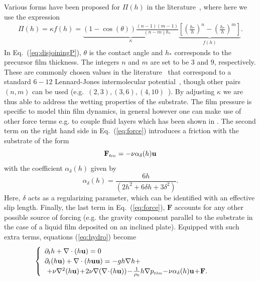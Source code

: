 Various forms have been proposed for $\Pi(h)$ in the literature~\cite{oronLongscaleEvolutionThin1997,thielePatternedDepositionMoving2014}, where here we use the expression
\begin{eqnarray}\label{eq:disjoiningP}
  \Pi(h) = \kappa f(h) = \underbrace{(1 - \cos(\theta))\frac{(n-1)(m-1)}{(n-m)h_*}}_{\kappa}\underbrace{\left[\left(\frac{h_*}{h}\right)^n -\left(\frac{h_*}{h}\right)^m\right]}_{f(h)}.
\end{eqnarray}
In Eq.~(\ref{eq:disjoiningP}), $\theta$ is the contact angle and $h_*$ corresponds to the precursor film thickness. 
The integers $n$ and $m$ are set to be $3$ and $9$, respectively. 
These are commonly chosen values in the literature~\cite{moultonEffectDisjoiningPressure2013,oronLongscaleEvolutionThin1997} that correspond to a standard $6-12$ Lennard-Jones intermolecular potential~\cite{fischerExistencePositiveSolutions2018}, though other pairs $(n,m)$ can be used (e.g.~$(2,3), (3,6), (4,10)$~\cite{diezStabilityFinitelengthRivulet2009,wilczekSlidingDropsEnsemble2017, wedershovenInfraredLaserInduced2014}). 
By adjusting $\kappa$ we are thus able to address the wetting properties of the substrate. 
The film pressure is specific to model thin film dynamics, in general however one can make use of other force terms e.g. to couple fluid layers which has been shown in \cite{roccaDevelopmentLatticeBoltzmann2012}. 
The second term on the right hand side in Eq.~(\ref{eq:force}) introduces a friction with the substrate of the form
\begin{equation}\label{eq:forcefric}
  \mathbf{F}_{\mbox{\tiny{fric}}} = -\nu \alpha_{\delta}(h)\mathbf{u}
\end{equation}
with the coefficient $\alpha_{\delta}(h)$ given by
\begin{equation}\label{eq:alphafric}
  \alpha_{\delta}(h) = \frac{6h}{(2 h^2 + 6 \delta h + 3 \delta^2)}.
\end{equation}
Here, $\delta$ acts as a regularizing parameter, which can be identified with an effective slip length. 
Finally, the last term in Eq.~(\ref{eq:force}), $\mathbf{F}$ accounts for any other possible source of forcing (e.g. the gravity component parallel to the substrate in the case of a liquid film deposited on an inclined plate).
Equipped with such extra terms, equations (\ref{eq:hydro}) become
\begin{equation}\label{eq:hydro2}
  \begin{cases}
    \begin{array}{ll}
      \partial_t h + \nabla \cdot (h \mathbf{u})  = 0 & \\ 
      \partial_t (h \mathbf{u}) + \nabla \cdot (h \mathbf{u}\mathbf{u}) = -gh \nabla h  +\\ 
      \,\, +  \nu \nabla^2 (h\mathbf{u}) \!+\! 2\nu \nabla (\nabla\! \cdot\! (h\mathbf{u}))
      \!-\!\frac{1}{\rho_0}h\nabla p_{\mbox{\tiny{film}}} \!-\! \nu \alpha_{\delta}(h) \mathbf{u}\!+\! \mathbf{F}. 
    \end{array}
  \end{cases}
\end{equation}
